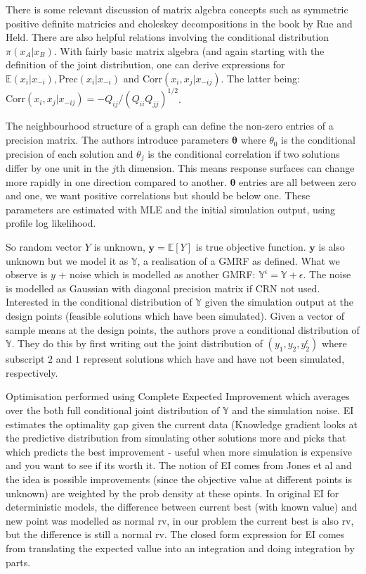 \documentclass{article}
\begin{document}
There is some relevant discussion of matrix algebra concepts such as symmetric positive definite matricies and choleskey decompositions in the book by Rue and Held. There are also helpful relations involving the conditional distribution $\pi(x_A|x_B)$. With fairly basic matrix algebra (and again starting with the definition of the joint distribution, one can derive expressions for $\mathbb{E}(x_i|x_{-i}), \text{Prec}(x_i|x_{-i})$ and $\text{Corr}(x_i,x_j|x_{-ij})$. The latter being: $\text{Corr}(x_i,x_j|x_{-ij}) = -Q_{ij}/(Q_{ii}Q_{jj})^{1/2}$. \newline

The neighbourhood structure of a graph can define the non-zero entries of a precision matrix. The authors introduce parameters $\boldsymbol{\theta}$ where $\theta_0$ is the conditional precision of each solution and $\theta_j$ is the conditional correlation if two solutions differ by one unit in the $j$th dimension. This means response surfaces can change more rapidly in one direction compared to another. $\boldsymbol{\theta}$ entries are all between zero and one, we want positive correlations but should be below one. These parameters are estimated with MLE and the initial simulation output, using profile log likelihood. \newline

So random vector $Y$ is unknown, $\boldsymbol{y}=\mathbb{E}[Y]$ is true objective function. $\boldsymbol{y}$ is also unknown but we model it as $\mathbb{Y}$, a realisation of a GMRF as defined. What we observe is $y$ + noise which is modelled as another GMRF: $\mathbb{Y}^{\epsilon} = \mathbb{Y} + \epsilon$. The noise is modelled as Gaussian with diagonal precision matrix if CRN not used. Interested in the conditional distribution of $\mathbb{Y}$ given the simulation output at the design points (feasible solutions which have been simulated). Given a vector of sample means at the design points, the authors prove a conditional distribution of $\mathbb{Y}$. They do this by first writing out the joint distribution of $(y_1,y_2,y_2^{\epsilon})$ where subscript $2$ and $1$ represent solutions which have and have not been simulated, respectively.\newline

Optimisation performed using Complete Expected Improvement which averages over the both full conditional joint distribution of $\mathbb{Y}$ and the simulation noise. EI estimates the optimality gap given the current data (Knowledge gradient looks at the predictive distribution from simulating other solutions more and picks that which predicts the best improvement - useful when more simulation is expensive and you want to see if its worth it. The notion of EI comes from Jones et al and the idea is possible improvements (since the objective value at different points is unknown) are weighted by the prob density at these opints. In original EI for deterministic models, the difference between current best (with known value) and new point was modelled as normal rv, in our problem the current best is also rv, but the difference is still a normal rv. The closed form expression for EI comes from translating the expected vallue into an integration and doing integration by parts. \newline
\end{document}

